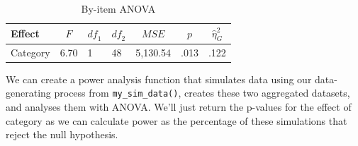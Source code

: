 \documentclass[doc,floatsintext]{apa6}
\newenvironment{Shaded}{\begin{snugshade}}{\end{snugshade}}
\newcommand{\KeywordTok}[1]{\textcolor[rgb]{0.13,0.29,0.53}{\textbf{#1}}}
\newcommand{\DataTypeTok}[1]{\textcolor[rgb]{0.13,0.29,0.53}{#1}}
\newcommand{\StringTok}[1]{\textcolor[rgb]{0.31,0.60,0.02}{#1}}
\newcommand{\CommentTok}[1]{\textcolor[rgb]{0.56,0.35,0.01}{\textit{#1}}}
\newcommand{\OperatorTok}[1]{\textcolor[rgb]{0.81,0.36,0.00}{\textbf{#1}}}
\newcommand{\NormalTok}[1]{#1}
\begin{document}
\begin{Shaded}
\end{Shaded}

\begin{table}[H]
\begin{center}
\begin{threeparttable}
\caption{\label{tab:by-item-anova}By-item ANOVA}
\begin{tabular}{lllllll}
\toprule
Effect & \multicolumn{1}{c}{$F$} & \multicolumn{1}{c}{$\mathit{df}_1$} & \multicolumn{1}{c}{$\mathit{df}_2$} & \multicolumn{1}{c}{$\mathit{MSE}$} & \multicolumn{1}{c}{$p$} & \multicolumn{1}{c}{$\hat{\eta}^2_G$}\\
\midrule
Category & 6.70 & 1 & 48 & 5,130.54 & .013 & .122\\
\bottomrule
\end{tabular}
\end{threeparttable}
\end{center}
\end{table}

We can create a power analysis function that simulates data using our
data-generating process from \texttt{my\_sim\_data()}, creates these two
aggregated datasets, and analyses them with ANOVA. We'll just return the
p-values for the effect of category as we can calculate power as the
percentage of these simulations that reject the null hypothesis.
\end{document}
